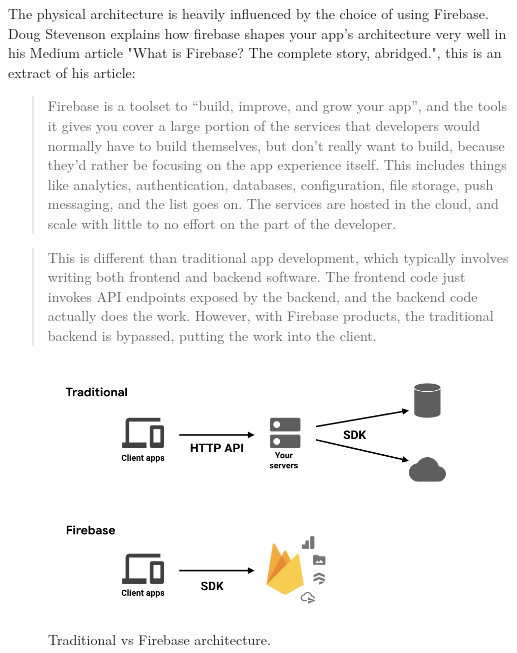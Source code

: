 
The physical architecture is heavily influenced by the choice of using Firebase. Doug Stevenson explains how firebase shapes your app's architecture very well in his Medium article "What is Firebase? The complete story, abridged."\cite{firebase-article}, this is an extract of his article:

\begin{quote}
    \onehalfspacing
    Firebase is a toolset to “build, improve, and grow your app”, and the tools it gives you cover a large portion of the services that developers would normally have to build themselves, but don’t really want to build, because they’d rather be focusing on the app experience itself. This includes things like analytics, authentication, databases, configuration, file storage, push messaging, and the list goes on. The services are hosted in the cloud, and scale with little to no effort on the part of the developer.
\end{quote}
\begin{quote}
    \onehalfspacing
    This is different than traditional app development, which typically involves writing both frontend and backend software. The frontend code just invokes API endpoints exposed by the backend, and the backend code actually does the work. However, with Firebase products, the traditional backend is bypassed, putting the work into the client.
\end{quote}

\vfill
\begin{figure}[H]
    \center
    \includegraphics[width=0.95\columnwidth]{media/diagrams/firebase-diagram.png}
    \caption{Traditional vs Firebase architecture. \cite{firebase-article}}
    \label{fig:firebase-diagram}
\end{figure}
\vfill



